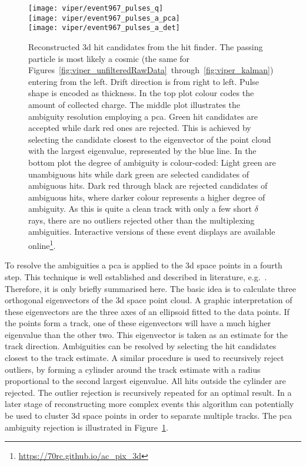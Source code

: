 \begin{figure}[tbp]
	\begin{minipage}{\textwidth}
		\centering
		\texttt{[image: viper/event967\_pulses\_q]} \\
		\texttt{[image: viper/event967\_pulses\_a\_pca]} \\
		\texttt{[image: viper/event967\_pulses\_a\_det]}
		\caption[Reconstructed  hits of typical pixel demonstrator event]{%
			Reconstructed \acrshort{3d} hit candidates from the hit finder.
			The passing particle is most likely a cosmic \Pgm (the same for Figures~\ref{fig:viper_unfilteredRawData}~through~\ref{fig:viper_kalman}) entering from the left.
			Drift direction is from right to left.
			Pulse shape is encoded as thickness.
			In the top plot colour codes the amount of collected charge.
			The middle plot illustrates the ambiguity resolution employing a \acrshort{pca}.
			Green hit candidates are accepted while dark red ones are rejected.
			This is achieved by selecting the candidate closest to the eigenvector of the point cloud with the largest eigenvalue, represented by the blue line.
			In the bottom plot the degree of ambiguity is colour-coded: Light green are unambiguous hits while dark green are selected candidates of ambiguous hits.
			Dark red through black are rejected candidates of ambiguous hits, where darker colour represents a higher degree of ambiguity.
			As this is quite a clean track with only a few short $\delta$ rays, there are no outliers rejected other than the multiplexing ambiguities.
			Interactive versions of these event displays are available online\footnote{\url{https://70rc.github.io/ac_pix_3d}}.
		}
		\label{fig:viper_pca}
	\end{minipage}
\end{figure}

To resolve the ambiguities a \gls{pca} is applied to the \gls{3d} space points in a fourth step.
This technique is well established and described in literature, e.g.~\cite{pca}.
Therefore, it is only briefly summarised here.
The basic idea is to calculate three orthogonal eigenvectors of the \gls{3d} space point cloud.
A graphic interpretation of these eigenvectors are the three axes of an ellipsoid fitted to the data points.
If the points form a track, one of these eigenvectors will have a much higher eigenvalue than the other two.
This eigenvector is taken as an estimate for the track direction.
Ambiguities can be resolved by selecting the hit candidates closest to the track estimate.
A similar procedure is used to recursively reject outliers, by forming a cylinder around the track estimate with a radius proportional to the second largest eigenvalue.
All hits outside the cylinder are rejected.
The outlier rejection is recursively repeated for an optimal result.
In a later stage of reconstructing more complex events this algorithm can potentially be used to cluster \gls{3d} space points in order to separate multiple tracks.
The \gls{pca} ambiguity rejection is illustrated in Figure~\ref{fig:viper_pca}.

